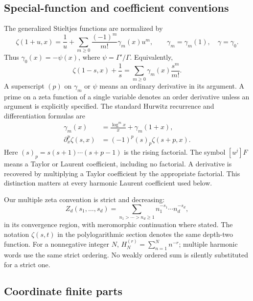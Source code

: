 \documentclass[11pt]{article}
\numberwithin{equation}{section}
\theoremstyle{plain}
\theoremstyle{definition}
\theoremstyle{remark}
\begin{document}
\subsection{Special-function and coefficient conventions}

The generalized Stieltjes functions are normalized by
\begin{equation}\label{scope:stieltjes}
 \zeta(1+u,x)=\frac1u+
       \sum_{m\ge0}\frac{(-1)^m}{m!}\gamma_m(x)u^m,
 \qquad \gamma_m=\gamma_m(1),\quad \gamma=\gamma_0.
\end{equation}
Thus $\gamma_0(x)=-\psi(x)$, where $\psi=\Gamma'/\Gamma$.
Equivalently,
\[
 \zeta(1-s,x)+\frac1s=\sum_{m\ge0}\gamma_m(x)\frac{s^m}{m!}.
\]
A superscript $(p)$ on $\gamma_m$ or $\psi$ means an ordinary derivative
in its argument. A prime on a zeta function of a single variable denotes
an order derivative unless an argument is explicitly specified.
The standard Hurwitz recurrence and differentiation formulas are
\cite{dlmf:hurwitz,dlmf:polygamma}
\begin{align}
 \gamma_m(x)&=\frac{\log^m x}{x}+\gamma_m(1+x),
       \label{scope:recurrence}\\
 \partial_x^p\zeta(s,x)&=(-1)^p(s)_p\zeta(s+p,x).
       \label{scope:hurwitzderivative}
\end{align}
Here $(s)_p=s(s+1)\cdots(s+p-1)$ is the rising factorial.
The symbol $[u^j]F$ means a Taylor or Laurent coefficient, including
no factorial. A derivative is recovered by multiplying a Taylor
coefficient by the appropriate factorial. This distinction matters at
every harmonic Laurent coefficient used below.

Our multiple zeta convention is strict and decreasing:
\[
 Z_d(s_1,\ldots,s_d)
   =\sum_{n_1>\cdots>n_d\ge1}
       n_1^{-s_1}\cdots n_d^{-s_d},
\]
in its convergence region, with meromorphic continuation where stated.
The notation $\zeta(s,t)$ in the polylogarithmic section denotes the
same depth-two function. For a nonnegative integer $N$,
$H_N^{(r)}=\sum_{n=1}^N n^{-r}$; multiple harmonic words use the same
strict ordering. No weakly ordered sum is silently substituted for a
strict one.

\subsection{Coordinate finite parts}
\end{document}
